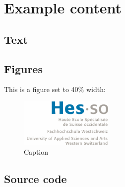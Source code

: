 \documentclass[a4paper,11pt,oneside]{book}
\begin{document}
\frontmatter



\mainmatter

\chapter{Example content}

\section{Text}

\blindtext

\blinditemize

\blindtext

\blindenumerate

\blindtext

\blinddescription

\blindtext


\section{Figures}

This is a figure set to 40\% width:

\begin{figure}[H]
    \centering
    \includegraphics[width=0.4\textwidth]{img/logo_hes-so}

    \caption{Caption}
\end{figure}

\section{Source code}
\end{document}
